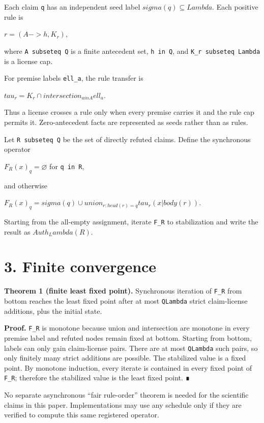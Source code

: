 \documentclass[11pt]{article}
\begin{document}
Each claim \texttt{q} has an independent seed label
\(sigma(q) \subseteq Lambda\). Each positive rule is

\(r=(A -> h, K_r)\),

where \texttt{A\ subseteq\ Q} is a finite antecedent set,
\texttt{h\ in\ Q}, and \texttt{K\_r\ subseteq\ Lambda} is a license cap.

For premise labels \texttt{ell\_a}, the rule transfer is

\(tau_r = K_r \cap intersection_{a in A} ell_a\).

Thus a license crosses a rule only when every premise carries it and the
rule cap permits it. Zero-antecedent facts are represented as seeds
rather than as rules.

Let \texttt{R\ subseteq\ Q} be the set of directly refuted claims.
Define the synchronous operator

\(F_R(x)_q = \varnothing\) for \texttt{q\ in\ R},

and otherwise

\(F_R(x)_q = sigma(q) \cup union_{r:head(r)=q} tau_r(x|body(r))\).

Starting from the all-empty assignment, iterate \texttt{F\_R} to
stabilization and write the result as \(Auth_Lambda(R)\).

\hypertarget{finite-convergence}{%
\section{3. Finite convergence}\label{finite-convergence}}

\textbf{Theorem 1 (finite least fixed point).} Synchronous iteration of
\texttt{F\_R} from bottom reaches the least fixed point after at most
\texttt{\textbar{}Q\textbar{}\textbar{}Lambda\textbar{}} strict
claim-license additions, plus the initial state.

\textbf{Proof.} \texttt{F\_R} is monotone because union and intersection
are monotone in every premise label and refuted nodes remain fixed at
bottom. Starting from bottom, labels can only gain claim-license pairs.
There are at most
\texttt{\textbar{}Q\textbar{}\textbar{}Lambda\textbar{}} such pairs, so
only finitely many strict additions are possible. The stabilized value
is a fixed point. By monotone induction, every iterate is contained in
every fixed point of \texttt{F\_R}; therefore the stabilized value is
the least fixed point. ∎

No separate asynchronous ``fair rule-order'' theorem is needed for the
scientific claims in this paper. Implementations may use any schedule
only if they are verified to compute this same registered operator.
\end{document}
